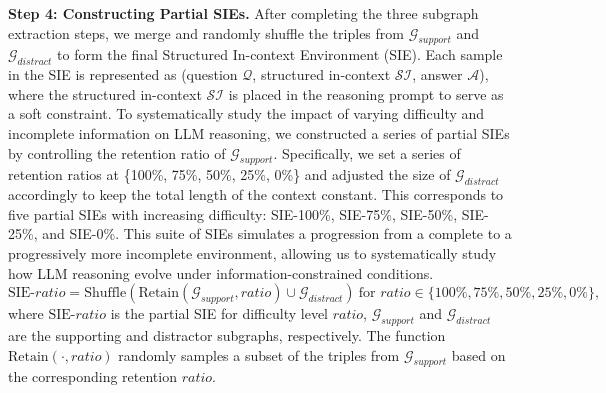 \documentclass{article} %
\begin{document}
\textbf{Step 4: Constructing Partial SIEs.}
After completing the three subgraph extraction steps, we merge and randomly shuffle the triples from $\mathcal{G}_{support}$ and $\mathcal{G}_{distract}$ to form the final Structured In-context Environment (SIE). Each sample in the SIE is represented as (question $\mathcal{Q}$, structured in-context $\mathcal{SI}$, answer $\mathcal{A}$), where the structured in-context $\mathcal{SI}$ is placed in the reasoning prompt to serve as a soft constraint. 
To systematically study the impact of varying difficulty and incomplete information on LLM reasoning, we constructed a series of partial SIEs by controlling the retention ratio of $\mathcal{G}_{support}$. Specifically, we set a series of retention ratios at \{100\%, 75\%, 50\%, 25\%, 0\%\} and adjusted the size of $\mathcal{G}_{distract}$ accordingly to keep the total length of the context constant. This corresponds to five partial SIEs with increasing difficulty: SIE-100\%, SIE-75\%, SIE-50\%, SIE-25\%, and SIE-0\%. This suite of SIEs simulates a progression from a complete to a progressively more incomplete environment, allowing us to systematically study how LLM reasoning evolve under information-constrained conditions. 
{\small
\begin{equation}
    \text{SIE-}ratio = \text{Shuffle}(\text{Retain}(\mathcal{G}_{support}, ratio) \cup \mathcal{G}_{distract}) \ \text{for } ratio \in \{100\%, 75\%, 50\%, 25\%, 0\%\},
\end{equation}
}
where $\text{SIE-}ratio$ is the partial SIE for difficulty level $ratio$, $\mathcal{G}_{support}$ and $\mathcal{G}_{distract}$ are the supporting and distractor subgraphs, respectively. The function $\text{Retain}(\cdot, ratio)$ randomly samples a subset of the triples from $\mathcal{G}_{support}$ based on the corresponding retention $ratio$. 
\end{document}
